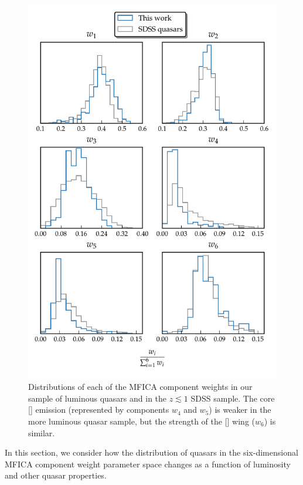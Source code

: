 \begin{figure}
\centering
    \includegraphics[width=\textwidth]{figures/chapter04/mfica_component_weights.pdf}
    \caption[{Distributions of each of the MFICA component weights in our sample of luminous quasars and in the $z \lesssim 1$ SDSS sample.}]{Distributions of each of the MFICA component weights in our sample of luminous quasars and in the $z \lesssim 1$ SDSS sample. The core [] emission (represented by components $w_4$ and $w_5$) is weaker in the more luminous quasar sample, but the strength of the [] wing ($w_6$) is similar. }
    \label{fig:mfica_component_weights}
\end{figure}

In this section, we consider how the distribution of quasars in the six-dimensional MFICA component weight parameter space changes as a function of luminosity and other quasar properties.

